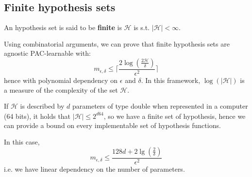\subsection*{Finite hypothesis sets}

An hypothesis set is said to be \textbf{finite} is $\mathcal{H}$ is s.t. $|\mathcal{H}| < \infty$.

Using combinatorial arguments, we can prove that finite hypothesis sets are agnostic PAC-learnable with:
$$
m_{\epsilon, \delta} \leq \lceil \frac{2\log (\frac{2\mathcal{H}}{\delta})}{\epsilon^2} \rceil
$$
hence with polynomial dependency on $\epsilon$ and $\delta$. In this framework, $\log(|\mathcal{H}|)$ is a measure of the complexity of the set $\mathcal{H}$.
\begin{warningblock}
    If $\mathcal{H}$ is described by $d$ parameters of type double when represented in a computer (64 bits), it holds that $|\mathcal{H}| \leq 2^{d\dot 64}$, so we have a finite set of hypothesis, hence we can provide a bound on every implementable set of hypothesis functions.

    In this case,
    $$
    m_{\epsilon, \delta} \leq \frac{128d + 2\lg(\frac{2}{\delta})}{\epsilon^2}
    $$
    i.e. we have linear dependency on the number of parameters.
\end{warningblock}

